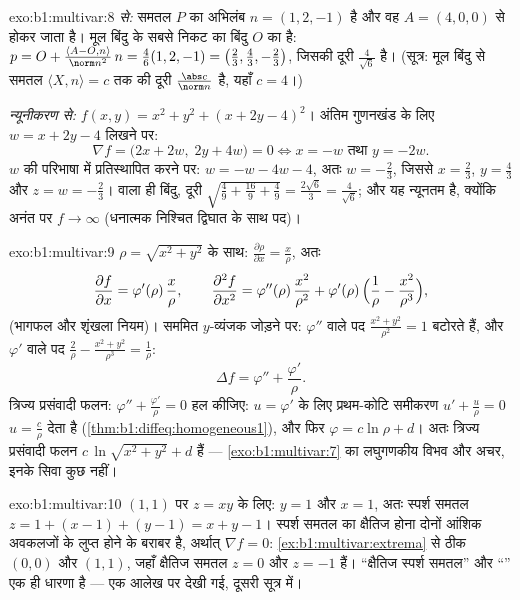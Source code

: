 \begin{solution}{exo:b1:multivar:8}
\emph{ से:} समतल $P$ का अभिलंब $n = (1, 2, -1)$ है और वह $A = (4,
0, 0)$ से होकर जाता है। मूल बिंदु के सबसे निकट का बिंदु $O$ का 
है: $p = O + \frac{\langle A - O, n\rangle}{\norm n^2}\,n =
\frac{4}{6}(1,2,-1) = \bigl(\frac23, \frac43, -\frac23\bigr)$, जिसकी दूरी
$\frac{4}{\sqrt 6}$ है। (सूत्र: मूल बिंदु से समतल $\langle X, n \rangle =
c$ तक की दूरी $\frac{\abs c}{\norm n}$ है, यहाँ $c = 4$।)

\emph{न्यूनीकरण से:} $f(x,y) = x^2 + y^2 + (x + 2y - 4)^2$। अंतिम गुणनखंड
के लिए $w = x + 2y - 4$ लिखने पर:
\[
\nabla f = \bigl(2x + 2w,\; 2y + 4w\bigr) = 0
\iff x = -w \text{ तथा } y = -2w .
\]
$w$ की परिभाषा में प्रतिस्थापित करने पर: $w = -w - 4w - 4$, अतः $w =
-\frac23$, जिससे $x = \frac23$, $y = \frac43$ और $z = w = -\frac23$।
 वाला ही बिंदु, दूरी $\sqrt{\frac49 + \frac{16}{9} + \frac49} =
\frac{2\sqrt 6}{3} = \frac{4}{\sqrt6}$; और यह न्यूनतम है, क्योंकि अनंत पर
$f \to \infty$ (धनात्मक निश्चित द्विघात के साथ  पद)।
\end{solution}

\begin{solution}{exo:b1:multivar:9}
$\rho = \sqrt{x^2+y^2}$ के साथ: $\frac{\partial \rho}{\partial x} =
\frac{x}{\rho}$, अतः
\[
\frac{\partial f}{\partial x} = \varphi'(\rho)\,\frac{x}{\rho},
\qquad
\frac{\partial^2 f}{\partial x^2}
= \varphi''(\rho)\,\frac{x^2}{\rho^2}
+ \varphi'(\rho)\,\Bigl(\frac{1}{\rho} -
\frac{x^2}{\rho^3}\Bigr),
\]
(भागफल और शृंखला नियम)। सममित $y$-व्यंजक जोड़ने पर: $\varphi''$ वाले पद
$\frac{x^2 + y^2}{\rho^2} = 1$ बटोरते हैं, और $\varphi'$ वाले पद
$\frac{2}{\rho} - \frac{x^2 + y^2}{\rho^3} = \frac{1}{\rho}$:
\[
\Delta f = \varphi'' + \frac{\varphi'}{\rho} .
\]
त्रिज्य प्रसंवादी फलन: $\varphi'' + \frac{\varphi'}{\rho} = 0$ हल कीजिए:
$u = \varphi'$ के लिए प्रथम-कोटि समीकरण $u' + \frac u\rho = 0$ $u =
\frac{c}{\rho}$ देता है (\cref{thm:b1:diffeq:homogeneous1}), और फिर
$\varphi = c\ln\rho + d$। अतः त्रिज्य प्रसंवादी फलन $c\,\ln\sqrt{x^2 +
y^2} + d$ हैं --- \cref{exo:b1:multivar:7} का लघुगणकीय विभव और अचर, इनके
सिवा कुछ नहीं।
\end{solution}

\begin{solution}{exo:b1:multivar:10}
$(1,1)$ पर $z = xy$ के लिए:  $y = 1$ और $x = 1$, अतः स्पर्श
समतल $z = 1 + (x - 1) + (y - 1) = x + y - 1$। स्पर्श समतल का क्षैतिज होना
दोनों आंशिक अवकलजों के लुप्त होने के बराबर है, अर्थात् $\nabla f = 0$:
\cref{ex:b1:multivar:extrema} से ठीक  $(0, 0)$ और $(1, 1)$,
जहाँ क्षैतिज समतल $z = 0$ और $z = -1$ हैं। ``क्षैतिज स्पर्श समतल'' और
``'' एक ही धारणा है --- एक आलेख पर देखी गई, दूसरी सूत्र में।
\end{solution}

